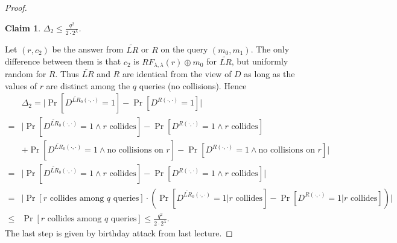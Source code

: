 \documentclass[12pt]{article}
\newtheorem{claim}[theorem]{Claim}
\theoremstyle{definition}
\begin{document}
\begin{proof}
\begin{claim}
$\Delta_2 \leq \frac{q^2}{2 \cdot 2^\lambda}$.
\end{claim}
Let $(r,c_2)$ be the answer from $\widetilde{LR}$ or $R$ on the query $(m_0,m_1)$. The only difference between them is that $c_2$ is $RF_{\lambda,\lambda}(r) \oplus m_0$ for $\widetilde{LR}$, but uniformly random for $R$. Thus $\widetilde{LR}$ and $R$ are identical from the view of $D$ as long as the values of $r$ are distinct among the $q$ queries (no collisions). Hence 
$$\begin{aligned}
&\Delta_2 
=  \bigg| \Pr[D^{\widetilde{LR}_0(\cdot,\cdot)}=1] - \Pr[D^{R(\cdot,\cdot)}=1] \bigg| \\
=& \bigg| \Pr[D^{\widetilde{LR}_0(\cdot,\cdot)}=1 \wedge \textrm{$r$ collides}] - \Pr[D^{R(\cdot,\cdot)}=1 \wedge \textrm{$r$ collides}] \\
&+ \Pr[D^{\widetilde{LR}_0(\cdot,\cdot)}=1 \wedge \textrm{no collisions on $r$}] - \Pr[D^{R(\cdot,\cdot)}=1 \wedge \textrm{no collisions on $r$}] \bigg| \\
=& \bigg| \Pr[D^{\widetilde{LR}_0(\cdot,\cdot)}=1 \wedge \textrm{$r$ collides}] - \Pr[D^{R(\cdot,\cdot)}=1 \wedge \textrm{$r$ collides}] \bigg|\\
=& \bigg| \Pr[\textrm{$r$ collides among $q$ queries}] \cdot (\Pr[D^{\widetilde{LR}_0(\cdot,\cdot)}=1 | \textrm{$r$ collides} ] - \Pr[D^{R(\cdot,\cdot)}=1 | \textrm{$r$ collides}]) \bigg|\\
\leq& \Pr[\textrm{$r$ collides among $q$ queries}] \leq \frac{q^2}{2\cdot 2^\lambda}.
\end{aligned}$$
The last step is given by birthday attack from last lecture.
\end{proof}
\end{document}
